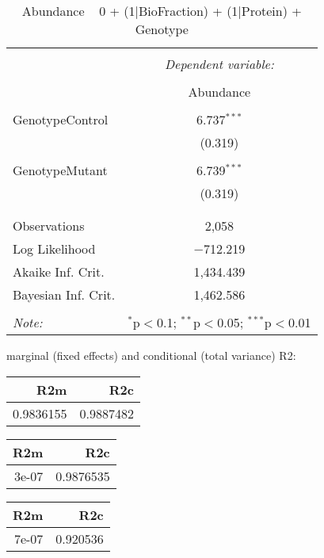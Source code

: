 \documentclass[11pt]{report}
\begin{document}
\begin{table}[!htbp] \centering 
  \caption{Abundance ~ 0 + (1|BioFraction) + (1|Protein) + Genotype} 
  \label{} 
\begin{tabular}{@{\extracolsep{5pt}}lc} 
\\[-1.8ex]\hline 
\hline \\[-1.8ex] 
 & \multicolumn{1}{c}{\textit{Dependent variable:}} \\ 
\cline{2-2} 
\\[-1.8ex] & Abundance \\ 
\hline \\[-1.8ex] 
 GenotypeControl & 6.737$^{***}$ \\ 
  & (0.319) \\ 
  & \\ 
 GenotypeMutant & 6.739$^{***}$ \\ 
  & (0.319) \\ 
  & \\ 
\hline \\[-1.8ex] 
Observations & 2,058 \\ 
Log Likelihood & $-$712.219 \\ 
Akaike Inf. Crit. & 1,434.439 \\ 
Bayesian Inf. Crit. & 1,462.586 \\ 
\hline 
\hline \\[-1.8ex] 
\textit{Note:}  & \multicolumn{1}{r}{$^{*}$p$<$0.1; $^{**}$p$<$0.05; $^{***}$p$<$0.01} \\ 
\end{tabular} 
\end{table} 
marginal (fixed effects) and conditional (total variance) R2:

\begin{tabular}{r|r}
\hline
R2m & R2c\\
\hline
0.9836155 & 0.9887482\\
\hline
\end{tabular}

\begin{tabular}{r|r}
\hline
R2m & R2c\\
\hline
3e-07 & 0.9876535\\
\hline
\end{tabular}

\begin{tabular}{r|r}
\hline
R2m & R2c\\
\hline
7e-07 & 0.920536\\
\hline
\end{tabular}
\end{document}
